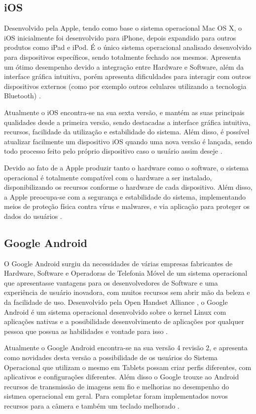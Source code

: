 \subsection{iOS}
Desenvolvido pela Apple, tendo como base o sistema operacional Mac OS X, o iOS inicialmente foi desenvolvido para iPhone, depois expandido para outros produtos como iPad e iPod. É o único sistema operacional analisado desenvolvido para dispositivos específicos, sendo totalmente fechado aos mesmos. Apresenta um ótimo desempenho devido a integração entre Hardware e Software, além da interface gráfica intuitiva, porém apresenta dificuldades para interagir com outros dispositivos externos (como por exemplo outros celulares utilizando a tecnologia Bluetooth) \cite{AvaliacaoComparativaSOMoveis}.

Atualmente o iOS encontra-se na sua sexta versão, e mantém as suas principais qualidades desde a primeira versão, sendo destacadas a interface gráfica intuitiva, recursos, facilidade da utilização e estabilidade do sistema. Além disso, é possível atualizar facilmente um dispositivo iOS quando uma nova versão é lançada, sendo todo processo feito pelo próprio dispositivo caso o usuário assim deseje \cite{Apple}.

Devido ao fato de a Apple produzir tanto o hardware como o software, o sistema operacional é totalmente compatível com o hardware a ser instalado, disponibilizando os recursos conforme o hardware de cada dispositivo. Além disso, a Apple preocupa-se com a segurança e estabilidade do sistema, implementando meios de proteção física contra vírus e malwares, e via aplicação para proteger os dados do usuários \cite{Apple}.

\subsection{Google Android}
O Google Android surgiu da necessidades de várias empresas fabricantes de Hardware, Software e Operadoras de Telefonia Móvel de um sistema operacional que apresentasse vantagens para os desenvolvedores de Software e uma experiência de usuário inovadora, com muitos recursos sem abrir mão da beleza e da facilidade de uso. Desenvolvido pela Open Handset Alliance \cite{OHA}, o Google Android é um sistema operacional desenvolvido sobre o kernel Linux com aplicações nativas e a possibilidade desenvolvimento de aplicações por qualquer pessoa que possua as habilidades e vontade para isso \cite{lechetagoogle}.

Atualmente o Google Android encontra-se na sua versão 4 revisão 2, e apresenta como novidades desta versão a possibilidade de os usuários do Sistema Operacional que utilizam o mesmo em Tablets possam criar perfis diferentes, com aplicativos e configurações diferentes. Além disso o Google trouxe ao Android recursos de transmissão de imagens sem fio e melhorias no desempenho do sistmea operacional em geral. Para completar foram implementados novos recursos para a câmera e também um teclado melhorado \cite{GoogleAndroid}.

